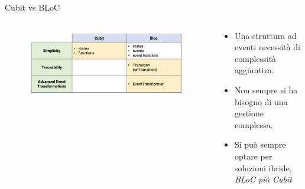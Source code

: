 \documentclass{../libs/presentation_format}
\begin{document}
\begin{frame}{Cubit vs BLoC}
	\begin{minipage}[0.2\textheight]{\textwidth}
		\begin{columns}[T]
			\begin{column}{0.4\textwidth}
				\begin{figure}[htpb]
					\centering
					\includegraphics[scale=0.15]{../libs/cubit-bloc-diffs}
				\end{figure}
			\end{column}
			\begin{column}{0.6\textwidth}
				\begin{itemize}
					\item Una struttura ad eventi necessità di complessità aggiuntiva.
					\item Non sempre si ha bisogno di una gestione complessa.
					\item Si può sempre optare per soluzioni ibride, 	\emph{BLoC più Cubit}
				\end{itemize}
			\end{column}
		\end{columns}
	\end{minipage}
\end{frame}

\end{document}
